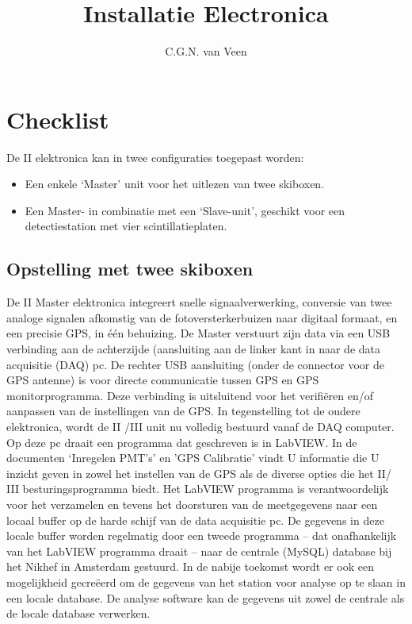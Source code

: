 

\title{Installatie \hisparc Electronica}
\author{C.G.N. van Veen}



\maketitle

\section{Checklist}

De \hisparc II elektronica kan in twee configuraties toegepast worden:
\begin{itemize}
    \item Een enkele ‘Master’ unit voor het uitlezen van twee skiboxen.
    \item Een Master- in combinatie met een ‘Slave-unit’, geschikt voor
    een detectiestation met vier scintillatieplaten.
\end{itemize}

\subsection{Opstelling met twee skiboxen}

De \hisparc II Master elektronica  integreert snelle signaalverwerking,
conversie van twee analoge signalen afkomstig van de
fotoversterkerbuizen naar digitaal formaat, en een precisie GPS, in één
behuizing. De Master verstuurt zijn data via een USB verbinding aan de
achterzijde (aansluiting aan de linker kant in 
naar de data acquisitie (DAQ) pc. De rechter USB aansluiting (onder de
connector voor de GPS antenne) is voor directe communicatie tussen GPS
en GPS monitorprogramma. Deze verbinding is uitsluitend voor het
verifiëren en/of aanpassen van de instellingen van de GPS. In
tegenstelling tot de oudere elektronica, wordt de \hisparc II /III unit
nu volledig bestuurd vanaf de DAQ computer. Op deze pc draait een
programma dat geschreven is in LabVIEW. In de documenten `Inregelen
PMT's' en 'GPS Calibratie'  vindt U informatie die U inzicht geven in
zowel het instellen van de GPS als de diverse opties die het \hisparc
II/ III besturingsprogramma biedt. Het LabVIEW programma is
verantwoordelijk voor het verzamelen en tevens het doorsturen van de
meetgegevens naar een locaal buffer op de harde schijf van de data
acquisitie pc. De gegevens in deze locale buffer worden regelmatig door
een tweede programma – dat onafhankelijk van het LabVIEW programma
draait – naar de centrale (MySQL) database bij het Nikhef in Amsterdam
gestuurd. In de nabije toekomst wordt er ook een mogelijkheid gecreëerd
om de gegevens van het station voor analyse op te slaan in een locale
database. De analyse software kan de gegevens uit zowel de centrale als
de locale database verwerken.

